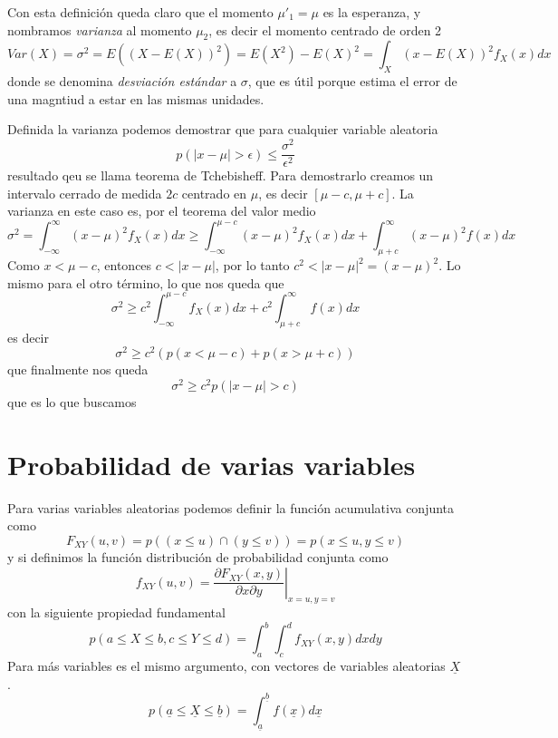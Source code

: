 \documentclass{article}
\numberwithin{equation}{section} %
\begin{document}
Con esta definición queda claro que el momento $\mu'_1 = \mu$ es la esperanza, y nombramos \emph{varianza} al momento $\mu_2$, es decir el momento centrado de orden 2
\begin{equation}
Var(X) = \sigma^2 = E((X - E(X))^2) = E(X^2) - E(X)^2 = \int_{X} (x - E(X))^2 f_X(x) dx
\end{equation}
donde se denomina \emph{desviación estándar} a $\sigma$, que es útil porque estima el error de una magntiud a estar en las mismas unidades.

Definida la varianza podemos demostrar que para cualquier variable aleatoria
\begin{equation}
p(|x - \mu|>\epsilon) \leq \frac{\sigma^2}{\epsilon^2}
\end{equation}
resultado qeu se llama teorema de Tchebisheff. Para demostrarlo creamos un intervalo cerrado de medida $2c$ centrado en $\mu$, es decir $[\mu - c, \mu + c]$. La varianza en este caso es, por el teorema del valor medio
\[\sigma^2 = \int_{-\infty}^{\infty} (x - \mu)^2 f_X(x) dx \geq \int_{-\infty}^{\mu - c} (x - \mu)^2 f_X(x) dx + \int_{\mu + c}^{\infty} (x - \mu)^2 f(x) dx\]
Como $x < \mu - c$, entonces $c < |x - \mu|$, por lo tanto $c^2 < |x - \mu|^2 = (x - \mu)^2$. Lo mismo para el otro término, lo que nos queda que 
\[\sigma^2 \geq c^2 \int_{-\infty}^{\mu - c} f_X(x) dx + c^2 \int_{\mu + c}^{\infty} f(x) dx\]
es decir
\[\sigma^2 \geq c^2 (p(x < \mu - c) + p(x > \mu + c)) \]
que finalmente nos queda
\[\sigma^2 \geq c^2 p(|x - \mu | > c)\]
que es lo que buscamos
\section{Probabilidad de varias variables}
Para varias variables aleatorias podemos definir la función acumulativa conjunta como
\begin{equation}
F_{XY}(u,v) = p((x \leq u) \cap (y \leq v)) = p(x \leq u, y \leq v)
\end{equation}
y si definimos la función distribución de probabilidad conjunta como
\begin{equation}
f_{XY}(u,v) = \left.\frac{\partial F_{XY}(x,y)}{\partial x \partial y}\right|_{x = u, y = v}
\end{equation}
con la siguiente propiedad fundamental
\begin{equation}
p(a \leq X \leq b, c \leq Y \leq d) = \int^b_a \int^d_c f_{XY}(x,y) dx dy
\end{equation}
Para más variables es el mismo argumento, con vectores de variables aleatorias $\underline{X}$.
\begin{equation}
p(\underline{a} \leq \underline{X} \leq \underline{b}) = \int_{\underline{a}}^{\underline{b}} f(\underline{x}) d\underline{x}
\end{equation}
\end{document}
